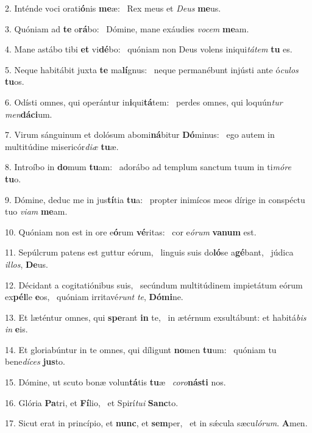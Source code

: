 2. Inténde voci orati\textbf{ó}nis \textbf{me}æ: \ast\  Rex meus et \textit{De}\textit{us} \textbf{me}us.\

3. Quóniam ad \textbf{te} o\textbf{rá}bo: \ast\  Dómine, mane exáudies \textit{vo}\textit{cem} \textbf{me}am.\

4. Mane astábo tibi \textbf{et} vi\textbf{dé}bo: \ast\  quóniam non Deus volens iniqui\textit{tá}\textit{tem} \textbf{tu} es.\

5. Neque habitábit juxta \textbf{te} ma\textbf{lí}gnus: \ast\  neque permanébunt injústi ante ó\textit{cu}\textit{los} \textbf{tu}os.\

6. Odísti omnes, qui operántur in\textbf{i}qui\textbf{tá}tem: \ast\  perdes omnes, qui loquún\textit{tur} \textit{men}\textbf{dá}\textbf{ci}um.\

7. Virum sánguinum et dolósum abomi\textbf{ná}bitur \textbf{Dó}minus: \ast\  ego autem in multitúdine misericór\textit{di}\textit{æ} \textbf{tu}æ.\

8. Introíbo in \textbf{do}mum \textbf{tu}am: \ast\  adorábo ad templum sanctum tuum in ti\textit{mó}\textit{re} \textbf{tu}o.\

9. Dómine, deduc me in jus\textbf{tí}tia \textbf{tu}a: \ast\  propter inimícos meos dírige in conspéctu tuo \textit{vi}\textit{am} \textbf{me}am.\

10. Quóniam non est in ore e\textbf{ó}rum \textbf{vé}ritas: \ast\  cor e\textit{ó}\textit{rum} \textbf{va}\textbf{num} est.\

11. Sepúlcrum patens est guttur eórum, \dag\  linguis suis do\textbf{ló}se a\textbf{gé}bant, \ast\  júdica \textit{il}\textit{los}, \textbf{De}us.\

12. Décidant a cogitatiónibus suis, \dag\  secúndum multitúdinem impietátum eórum ex\textbf{pél}le \textbf{e}os, \ast\  quóniam irritavé\textit{runt} \textit{te}, \textbf{Dó}\textbf{mi}ne.\

13. Et læténtur omnes, qui \textbf{spe}rant \textbf{in} te, \ast\  in ætérnum exsultábunt: et habitá\textit{bis} \textit{in} \textbf{e}is.\

14. Et gloriabúntur in te omnes, qui díligunt \textbf{no}men \textbf{tu}um: \ast\  quóniam tu bene\textit{dí}\textit{ces} \textbf{jus}to.\

15. Dómine, ut scuto bonæ volun\textbf{tá}tis \textbf{tu}æ \ast\  \textit{co}\textit{ro}\textbf{nás}\textbf{ti} nos.\

16. Glória \textbf{Pa}tri, et \textbf{Fí}lio, \ast\  et Spirí\textit{tu}\textit{i} \textbf{Sanc}to.\

17. Sicut erat in princípio, et \textbf{nunc}, et \textbf{sem}per, \ast\  et in sǽcula sæcu\textit{ló}\textit{rum}. \textbf{A}men.\

